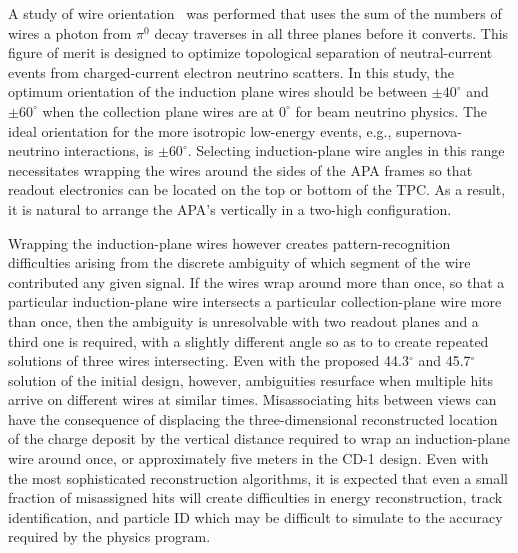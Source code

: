 
A study of wire orientation~\cite{docdb2836} was performed that uses
the sum of the numbers of wires a photon from $\pi^0$ decay traverses
in all three planes before it converts.  This figure of merit is
designed to optimize topological separation of neutral-current events
from charged-current electron neutrino scatters.  In this study, the
optimum orientation of the induction plane wires should be between
$\pm40^\circ$ and $\pm60^\circ$ when the collection plane wires are at
$0^\circ$ for beam neutrino physics. The ideal orientation for the
more isotropic low-energy events, e.g., supernova-neutrino
interactions, is $\pm60^\circ$.  Selecting induction-plane wire angles
in this range necessitates wrapping the wires around the sides of the
APA frames so that readout electronics can be located on the top or
bottom of the TPC.  As a result, it is natural to arrange the APA's
vertically in a two-high configuration.

Wrapping the induction-plane wires however creates pattern-recognition
difficulties arising from the discrete ambiguity of which segment of
the wire contributed any given signal.  If the wires wrap around more
than once, so that a particular induction-plane wire intersects a
particular collection-plane wire more than once, then the ambiguity is
unresolvable with two readout planes and a third one is required, with
a slightly different angle so as to to create repeated solutions of
three wires intersecting.  Even with the proposed 44.3$^\circ$ and
45.7$^\circ$ solution of the initial design, however, ambiguities
resurface when multiple hits arrive on different wires at similar
times.  Misassociating hits between views can have the consequence of
displacing the three-dimensional reconstructed location of the charge
deposit by the vertical distance required to wrap an induction-plane
wire around once, or approximately five meters in the CD-1 design.
Even with the most sophisticated reconstruction algorithms, it is
expected that even a small fraction of misassigned hits will create
difficulties in energy reconstruction, track identification, and
particle ID which may be difficult to simulate to the accuracy
required by the physics program.

